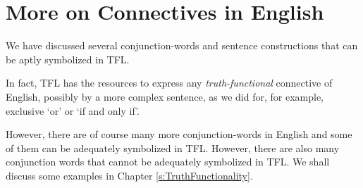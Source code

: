 \section{More on Connectives in English}
We have discussed several conjunction-words and sentence constructions that can be aptly symbolized in TFL. 

In fact, TFL has the resources to express any \emph{truth-functional} connective of English, possibly by a more complex sentence, as we did for, for example, exclusive `or' or `if and only if'. 

However, there are of course many more conjunction-words in English and some of them can be adequately symbolized in TFL. However, there are also many conjunction words that cannot be adequately symbolized in TFL. We shall discuss some examples in Chapter \ref{s:TruthFunctionality}.



